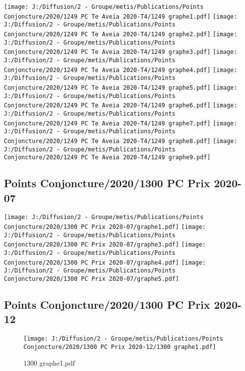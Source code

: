 \documentclass[
]{article}
\begin{document}
\texttt{[image: J:/Diffusion/2 - Groupe/metis/Publications/Points Conjoncture/2020/1249 PC Te Aveia 2020-T4/1249 graphe1.pdf]}
\texttt{[image: J:/Diffusion/2 - Groupe/metis/Publications/Points Conjoncture/2020/1249 PC Te Aveia 2020-T4/1249 graphe2.pdf]}
\texttt{[image: J:/Diffusion/2 - Groupe/metis/Publications/Points Conjoncture/2020/1249 PC Te Aveia 2020-T4/1249 graphe3.pdf]}
\texttt{[image: J:/Diffusion/2 - Groupe/metis/Publications/Points Conjoncture/2020/1249 PC Te Aveia 2020-T4/1249 graphe4.pdf]}
\texttt{[image: J:/Diffusion/2 - Groupe/metis/Publications/Points Conjoncture/2020/1249 PC Te Aveia 2020-T4/1249 graphe5.pdf]}
\texttt{[image: J:/Diffusion/2 - Groupe/metis/Publications/Points Conjoncture/2020/1249 PC Te Aveia 2020-T4/1249 graphe6.pdf]}
\texttt{[image: J:/Diffusion/2 - Groupe/metis/Publications/Points Conjoncture/2020/1249 PC Te Aveia 2020-T4/1249 graphe7.pdf]}
\texttt{[image: J:/Diffusion/2 - Groupe/metis/Publications/Points Conjoncture/2020/1249 PC Te Aveia 2020-T4/1249 graphe8.pdf]}
\texttt{[image: J:/Diffusion/2 - Groupe/metis/Publications/Points Conjoncture/2020/1249 PC Te Aveia 2020-T4/1249 graphe9.pdf]}

\hypertarget{points-conjoncture20201300-pc-prix-2020-07}{%
\subsection{Points Conjoncture/2020/1300 PC Prix
2020-07}\label{points-conjoncture20201300-pc-prix-2020-07}}

\texttt{[image: J:/Diffusion/2 - Groupe/metis/Publications/Points Conjoncture/2020/1300 PC Prix 2020-07/graphe1.pdf]}
\texttt{[image: J:/Diffusion/2 - Groupe/metis/Publications/Points Conjoncture/2020/1300 PC Prix 2020-07/graphe3.pdf]}
\texttt{[image: J:/Diffusion/2 - Groupe/metis/Publications/Points Conjoncture/2020/1300 PC Prix 2020-07/graphe4.pdf]}
\texttt{[image: J:/Diffusion/2 - Groupe/metis/Publications/Points Conjoncture/2020/1300 PC Prix 2020-07/graphe5.pdf]}

\hypertarget{points-conjoncture20201300-pc-prix-2020-12}{%
\subsection{Points Conjoncture/2020/1300 PC Prix
2020-12}\label{points-conjoncture20201300-pc-prix-2020-12}}

\begin{figure}
\centering
\texttt{[image: J:/Diffusion/2 - Groupe/metis/Publications/Points Conjoncture/2020/1300 PC Prix 2020-12/1300 graphe1.pdf]}
\caption{1300 graphe1.pdf}
\end{figure}
\end{document}
